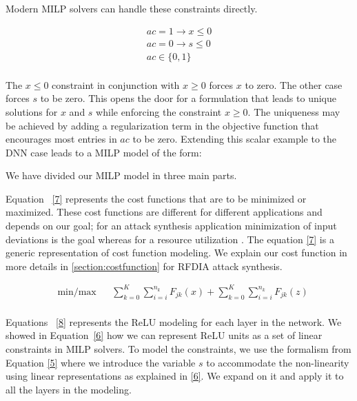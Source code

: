 Modern MILP solvers can handle these constraints directly.

\begin{equation}
\label{6}
\begin{aligned}
ac =  1 \rightarrow x \leq 0  \\
ac =  0 \rightarrow s \leq 0  \\
ac \in \{0,1\} \\
\end{aligned}
\end{equation}

The $x \leq 0$ constraint in conjunction with $x \geq 0$ forces $x$ to zero. The other case forces $s$ to be zero.
This opens the door for a formulation that leads to unique solutions for $x$ and $s$ while enforcing the constraint $x \geq 0$.
The uniqueness may be achieved by adding a regularization term in the objective function that encourages most entries in $ac$ to be zero.
Extending this scalar example to the DNN case leads to a \ac{MILP} model of the form: 


We have divided our \ac{MILP} model in three main parts. 


Equation ~\ref{7} represents the cost functions that are to be minimized or maximized.
These cost functions are different for different applications and depends on our goal; for an attack synthesis application minimization of input deviations is the goal whereas for a resource utilization .
The equation \ref{7} is a generic representation of cost function modeling. 
We explain our cost function in more details in \ref{section:costfunction} for \ac{RFDIA} attack synthesis. 

\begin{equation}
\label{7}
\begin{aligned}
& \underset{}{\text{min/max}}
& &  \sum_{k=0}^{K} \sum_{i=i}^{n_k}F_{jk}(x)   + \sum_{k=0}^{K} \sum_{i=i}^{n_k}F_{jk}(z)  \\
\end{aligned}
\end{equation}


Equations ~\ref{8} represents the ReLU modeling for each layer in the network. 
We showed in Equation~\ref{6} how we can represent ReLU units as a set of linear constraints in \ac{MILP} solvers. 
To model the constraints, we use the formalism from Equation \ref{5} where we introduce the variable $s$ to accommodate the non-linearity using linear representations as explained in \ref{6}. 
We expand on it and apply it to all the layers in the modeling.   
 
